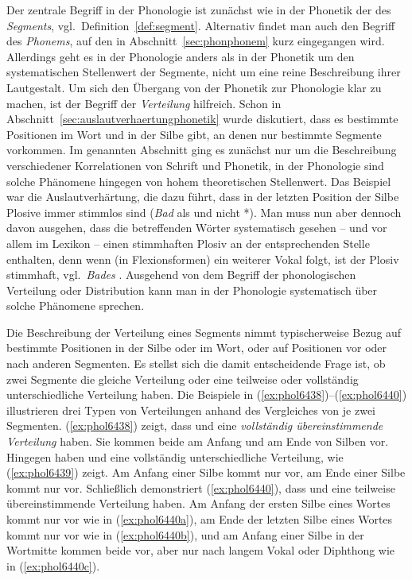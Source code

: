 Der zentrale Begriff in der Phonologie ist zunächst wie in der Phonetik der des \textit{Segments}, vgl.\ Definition~\ref{def:segment}.
Alternativ findet man auch den Begriff des \textit{Phonems}, auf den in Abschnitt~\ref{sec:phonphonem} kurz eingegangen wird.
Allerdings geht es in der Phonologie anders als in der Phonetik um den systematischen Stellenwert der Segmente, nicht um eine reine Beschreibung ihrer Lautgestalt.
Um sich den Übergang von der Phonetik zur Phonologie klar zu machen, ist der Begriff der \textit{Verteilung} hilfreich.
Schon in Abschnitt~\ref{sec:auslautverhaertungphonetik} wurde diskutiert, dass es bestimmte Positionen im Wort und in der Silbe gibt, an denen nur bestimmte Segmente vorkommen.
Im genannten Abschnitt ging es zunächst nur um die Beschreibung verschiedener Korrelationen von Schrift und Phonetik, in der Phonologie sind solche Phänomene hingegen von hohem theoretischen Stellenwert.
Das Beispiel war die Auslautverhärtung, die dazu führt, dass in der letzten Position der Silbe Plosive immer stimmlos sind (\textit{Bad} als \textipa{[ba:t]} und nicht *\textipa{[ba:d]}).
Man muss nun aber dennoch davon ausgehen, dass die betreffenden Wörter systematisch gesehen -- und vor allem im Lexikon -- einen stimmhaften Plosiv an der entsprechenden Stelle enthalten, denn wenn (\zB in Flexionsformen) ein weiterer Vokal folgt, ist der Plosiv stimmhaft, vgl.\ \textit{Bades} .
Ausgehend von dem Begriff der phonologischen Verteilung oder Distribution kann man in der Phonologie systematisch über solche Phänomene sprechen.


Die Beschreibung der Verteilung eines Segments nimmt typischerweise Bezug auf bestimmte Positionen in der Silbe oder im Wort, oder auf Positionen vor oder nach anderen Segmenten.
Es stellst sich die damit entscheidende Frage ist, ob zwei Segmente die gleiche Verteilung oder eine teilweise oder vollständig unterschiedliche Verteilung haben.
Die Beispiele in (\ref{ex:phol6438})--(\ref{ex:phol6440}) illustrieren drei Typen von Verteilungen anhand des Vergleiches von je zwei Segmenten.
(\ref{ex:phol6438}) zeigt, dass \textipa{[t]} und \textipa{[k]} eine \textit{vollständig übereinstimmende Verteilung} haben.
Sie kommen beide am Anfang und am Ende von Silben vor.
Hingegen haben \textipa{[h]} und \textipa{[N]} eine vollständig unterschiedliche  Verteilung, wie (\ref{ex:phol6439}) zeigt.
Am Anfang einer Silbe kommt nur \textipa{[h]} vor, am Ende einer Silbe kommt nur \textipa{[N]} vor.
Schließlich demonstriert (\ref{ex:phol6440}), dass \textipa{[s]} und \textipa{[z]} eine teilweise übereinstimmende Verteilung haben.
Am Anfang der ersten Silbe eines Wortes kommt nur \textipa{[z]} vor wie in (\ref{ex:phol6440a}), am Ende der letzten Silbe eines Wortes kommt nur \textipa{[s]} vor wie in (\ref{ex:phol6440b}), und am Anfang einer Silbe in der Wortmitte kommen beide vor, \textipa{[z]} aber nur nach langem Vokal oder Diphthong wie in (\ref{ex:phol6440c}).

